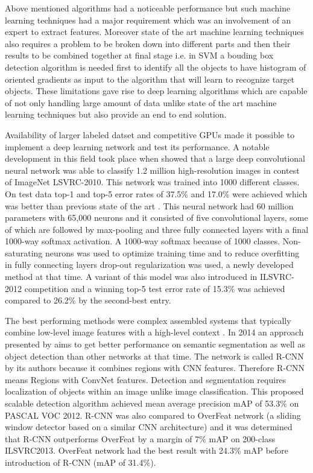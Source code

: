 \documentclass[11pt]{article}
\begin{document}
Above mentioned algorithms had a noticeable performance but such machine learning techniques had a major requirement which was an involvement of an expert to extract features. Moreover state of the art machine learning techniques also requires a problem to be broken down into different parts and then their results to be combined together at final stage i.e. in SVM a bouding box detection algorithm is needed first to identify all the objects to have histogram of oriented gradients as input to the algorithm that will learn to recognize target objects. These limitations gave rise to deep learning algorithms which are capable of not only handling large amount of data unlike state of the art machine learning techniques but also provide an end to end solution.

Availability of larger labeled datset and competitive GPUs made it possible to implement a deep learning network and test its performance. A notable development in this field took place when \cite{krizhevsky2012imagenet} showed that a large deep convolutional neural network  was able to classify  1.2 million high-resolution images in contest of ImageNet LSVRC-2010. This network was trained into 1000 different classes. On test data top-1 and top-5 error rates of 37.5\% and 17.0\% were achieved which was better than previous state of the art \cite{krizhevsky2012imagenet}. This neural network had 60 million parameters with 65,000 neurons and it consisted of five convolutional layers, some of which are followed by max-pooling and three fully connected layers with a final 1000-way softmax activation. A 1000-way softmax because of 1000 classes. Non-saturating neurons was used to optimize training time and to reduce overfitting in fully connecting layers drop-out regularization was used, a newly developed method at that time. A variant of this model was also introduced in ILSVRC-2012 competition and a winning top-5 test error rate of 15.3\% was achieved
compared to 26.2\% by the second-best entry.

The best performing methods were complex assembled systems that typically combine low-level image features with a high-level context \cite{girshick_rich_2013}. In 2014 an approach presented by \cite{girshick_rich_2013} aims to get better performance on semantic segmentation as well as object detection than other networks at that time. The network is called R-CNN by its authors because it combines regions with CNN features. Therefore R-CNN means Regions with ConvNet features. Detection and segmentation requires localization of objects within an image unlike image classification. This proposed scalable detection algorithm achieved mean average precision mAP of 53.3\% on PASCAL VOC 2012. R-CNN was also compared to OverFeat network (a sliding window detector based on a similar CNN architecture) and it was determined that R-CNN outperforms OverFeat by a margin of 7\% mAP on 200-class ILSVRC2013. OverFeat network had the best result with 24.3\% mAP before introduction of R-CNN (mAP of 31.4\%).
\end{document}
